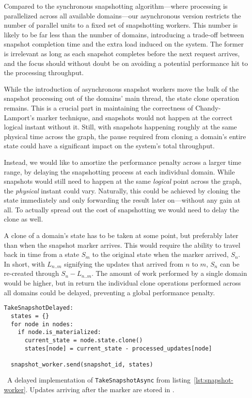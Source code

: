 Compared to the synchronous snapshotting algorithm---where processing is
parallelized across all available domains---our asynchronous version restricts
the number of parallel units to a fixed set of snapshotting workers. This number
is likely to be far less than the number of domains, introducing a trade-off
between snapshot completion time and the extra load induced on the system. The
former is irrelevant as long as each snapshot completes before the next request
arrives, and the focus should without doubt be on avoiding a potential
performance hit to the processing throughput.

While the introduction of asynchronous snapshot workers move the bulk of the
snapshot processing out of the domains' main thread, the state clone operation
remains. This is a crucial part in maintaining the correctness of
Chandy-Lamport's marker technique, and snapshots would not happen at the correct
logical instant without it. Still, with snapshots happening roughly at the same
physical time across the graph, the pause required from cloning a domain's
entire state could have a significant impact on the system's total throughput.

Instead, we would like to amortize the performance penalty across a larger time
range, by delaying the snapshotting process at each individual domain. While
snapshots would still need to happen at the same \textit{logical} point across
the graph, the \textit{physical} instant could vary. Naturally, this could be
achieved by cloning the state immediately and only forwarding the result later
on---without any gain at all. To actually spread out the cost of snapshotting we
would need to delay the clone as well.

A clone of a domain's state has to be taken at some point, but preferably later
than when the snapshot marker arrives. This would require the ability to travel
back in time from a state $ S_m $ to the original state when the marker arrived,
$ S_n $. In short, with $ L_{n..m} $ signifying the updates that arrived from $
n $ to $ m $, $ S_n $ can be re-created through $ S_n - L_{n..m} $.
The amount of work performed by a single domain would be higher, but in return
the individual clone operations performed across all domains could be delayed,
preventing a global performance penalty.

\begin{listing}[H]
  \begin{verbatim}
TakeSnapshotDelayed:
  states = {}
  for node in nodes:
    if node.is_materialized:
      current_state = node.state.clone()
      states[node] = current_state - processed_updates[node]

  snapshot_worker.send(snapshot_id, states)
  \end{verbatim}
  \caption{\
    A delayed implementation of \texttt{TakeSnapshotAsync} from
    listing~\ref{lst:snapshot-worker}. Updates arriving after the marker are
    stored in \code{processed\_updates}.
  }
\end{listing}

